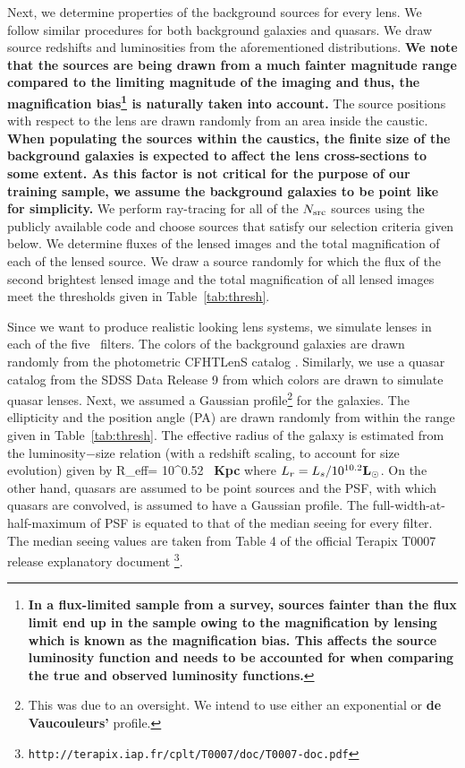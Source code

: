 \documentclass[useAMS,usenatbib,a4paper]{mn2e}
\begin{document}
Next, we determine properties of the background sources for every lens.
We follow similar procedures for both background galaxies and quasars.
We draw source redshifts and luminosities from the aforementioned
distributions. {\bf We note that the sources are being drawn from a much
fainter magnitude range compared to the limiting magnitude of the
\cfhtls imaging and thus, the magnification bias\footnote{ {\bf In a
flux-limited sample from a survey, sources fainter than the flux limit
end up in the sample owing to the magnification by lensing which is
known as the magnification bias. This affects the source luminosity
function and needs to be accounted for when comparing the true and
observed luminosity functions.}} is naturally taken into account.} The
source positions with respect to the lens are drawn randomly from an
area inside the caustic.  {\bf When populating the sources within the
caustics, the finite size of the background galaxies is expected to
affect the lens cross-sections to some extent. As this factor is not
critical for the purpose of our training sample, we assume the
background galaxies to be point like for simplicity.} We perform
ray-tracing for all of the $N_{\rm src}$ sources using the publicly
available code \gravlens \citep{Keeton2000} and choose sources that
satisfy our selection criteria given below. We determine fluxes of the
lensed images and the total magnification of each of the lensed source.
We draw a source randomly for which the flux of the second brightest
lensed image and the total magnification of all lensed images meet the
thresholds given in Table~\ref{tab:thresh}.

Since we want to produce realistic looking lens systems, we simulate
lenses in each of the five \cfhtls~filters. The colors of the background
galaxies are drawn randomly from the photometric CFHTLenS catalog
\citep{Hildebrandt2012,Erben2013}.  Similarly, we use a quasar catalog
from the SDSS Data Release 9 \citep{Paris2012} from which colors are
drawn to simulate quasar lenses. Next, we assumed a Gaussian
profile\footnote{This was due to an oversight. We intend to use either
an exponential or {\bf de Vaucouleurs'} profile.} for
the galaxies. The ellipticity and the position angle (PA) are drawn
randomly from within the range given in Table~\ref{tab:thresh}. The
effective radius of the galaxy is estimated from the luminosity$-$size
relation \citep{Bernardi2003} (with a redshift scaling, to account for
size evolution) given by
\be
R_{\rm eff}= 10^{0.52}  \, {\bf Kpc}
\ee
where $L_r=L_s/10^{10.2} {\bf L_\odot}$. On the other hand, quasars are assumed to be
point sources and the PSF, with which quasars are convolved, is assumed
to have a Gaussian profile. The full-width-at-half-maximum of PSF is
equated to that of the median seeing for every filter. The median seeing
values are taken from Table 4 of the official Terapix T0007 release
explanatory document \footnote{
\texttt{http://terapix.iap.fr/cplt/T0007/doc/T0007-doc.pdf}}.
\end{document}
